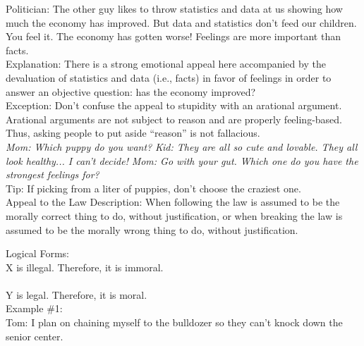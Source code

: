 \documentclass[a4paper,12pt,single,pdftex]{scrartcl}
\begin{document}
    
      Politician: The other guy likes to throw statistics and data at us showing how much the economy has improved. But data and statistics don't feed our children. You feel it. The economy has gotten worse! Feelings are more important than facts.
    \\

    
      Explanation: There is a strong emotional appeal here accompanied by the devaluation of statistics and data (i.e., facts) in favor of feelings in order to answer an objective question: has the economy improved?
    \\

    
      Exception: Don’t confuse the appeal to stupidity with an arational argument. Arational arguments are not subject to reason and are properly feeling-based. Thus, asking people to put aside “reason” is not fallacious.
    \\

    
      {\em Mom: Which puppy do you want?} \newline
{\em Kid: They are all so cute and lovable. They all look healthy... I can’t decide!} \newline
{\em Mom: Go with your gut. Which one do you have the strongest feelings for?}
    \\

    
      Tip: If picking from a liter of puppies, don’t choose the craziest one.
    \\

  

Appeal to the Law
    Description: When following the law is assumed to be the morally correct thing to do, without justification, or when breaking the law is assumed to be the morally wrong thing to do, without justification.

    
      Logical Forms:
    \\

    
      X is illegal. Therefore, it is immoral.
    \\

    
      
    \\

    
      Y is legal. Therefore, it is moral.
    \\

    
      Example \#1:
    \\

    
      Tom: I plan on chaining myself to the bulldozer so they can't knock down the senior center.
    \\
\end{document}
